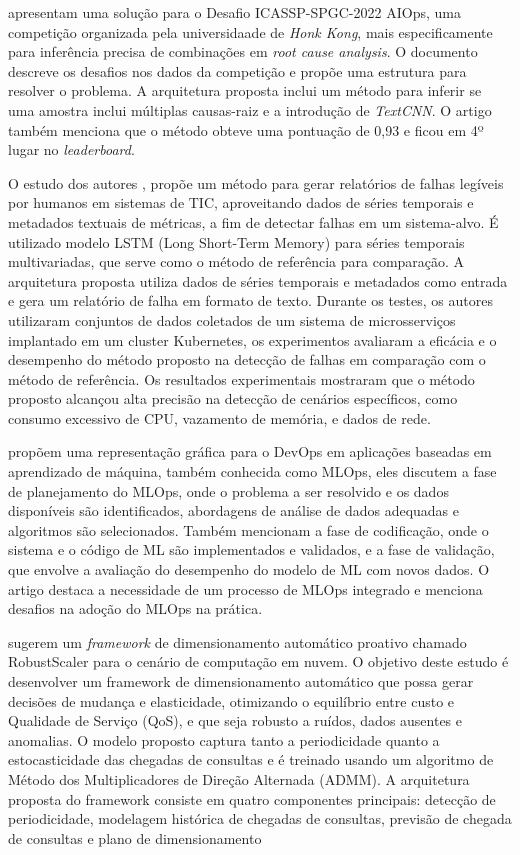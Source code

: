 \cite{9746416} apresentam uma solução para o Desafio ICASSP-SPGC-2022 AIOps, uma competição organizada pela universidaade de \textit{Honk Kong}, mais especificamente para inferência precisa de combinações em \textit{root cause analysis}. O documento descreve os desafios nos dados da competição e propõe uma estrutura para resolver o problema. A arquitetura proposta inclui um método para inferir se uma amostra inclui múltiplas causas-raiz e a introdução de \textit{TextCNN}. O artigo também menciona que o método obteve uma pontuação de 0,93 e ficou em 4º lugar no \textit{leaderboard}.


O estudo dos autores \cite{9789784}, propõe um método para gerar relatórios de falhas legíveis por humanos em sistemas de TIC, aproveitando dados de séries temporais e metadados textuais de métricas, a fim de detectar falhas em um sistema-alvo. É utilizado modelo LSTM (Long Short-Term Memory) para séries temporais multivariadas, que serve como o método de referência para comparação. A arquitetura proposta utiliza dados de séries temporais e metadados como entrada e gera um relatório de falha em formato de texto. Durante os testes, os autores utilizaram conjuntos de dados coletados de um sistema de microsserviços implantado em um cluster Kubernetes, os experimentos avaliaram a eficácia e o desempenho do método proposto na detecção de falhas em comparação com o método de referência. Os resultados experimentais mostraram que o método proposto alcançou alta precisão na detecção de cenários específicos, como consumo excessivo de CPU, vazamento de memória, e dados de rede.


\cite{9825776} propõem uma representação gráfica para o DevOps em aplicações baseadas em aprendizado de máquina, também conhecida como MLOps, eles discutem a fase de planejamento do MLOps, onde o problema a ser resolvido e os dados disponíveis são identificados, abordagens de análise de dados adequadas e algoritmos são selecionados. Também mencionam a fase de codificação, onde o sistema e o código de ML são implementados e validados, e a fase de validação, que envolve a avaliação do desempenho do modelo de ML com novos dados. O artigo destaca a necessidade de um processo de MLOps integrado e menciona desafios na adoção do MLOps na prática.

\cite{9835411} sugerem um \textit{framework} de dimensionamento automático proativo chamado RobustScaler para o cenário de computação em nuvem. O objetivo deste estudo é desenvolver um framework de dimensionamento automático que possa gerar decisões de mudança e elasticidade, otimizando o equilíbrio entre custo e Qualidade de Serviço (QoS), e que seja robusto a ruídos, dados ausentes e anomalias.  O modelo proposto captura tanto a periodicidade quanto a estocasticidade das chegadas de consultas e é treinado usando um algoritmo de Método dos Multiplicadores de Direção Alternada (ADMM). A arquitetura proposta do framework consiste em quatro componentes principais: detecção de periodicidade, modelagem histórica de chegadas de consultas, previsão de chegada de consultas e plano de dimensionamento 

